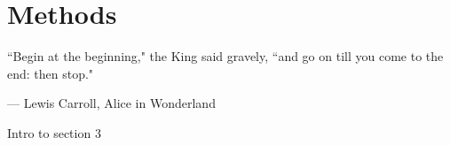 \chapter{Methods}
\label{sec:sec3}

\epigraph{``Begin at the beginning," the King said gravely, ``and go on till you
come to the end: then stop."}{--- \textup{Lewis Carroll}, Alice in Wonderland}

Intro to section 3
